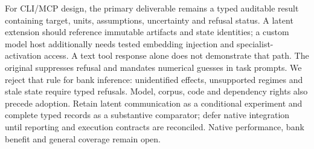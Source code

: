 For CLI/MCP design, the primary deliverable remains a typed auditable result containing target, units, assumptions, uncertainty and refusal status. A latent extension should reference immutable artifacts and state identities; a custom model host additionally needs tested embedding injection and specialist-activation access. A text tool response alone does not demonstrate that path. The original suppresses refusal and mandates numerical guesses in task prompts. We reject that rule for bank inference: unidentified effects, unsupported regimes and stale state require typed refusals. Model, corpus, code and dependency rights also precede adoption. Retain latent communication as a conditional experiment and complete typed records as a substantive comparator; defer native integration until reporting and execution contracts are reconciled. Native performance, bank benefit and general coverage remain open.~\citep{exec24_collaboration_original,exec24_collaboration_reference}
